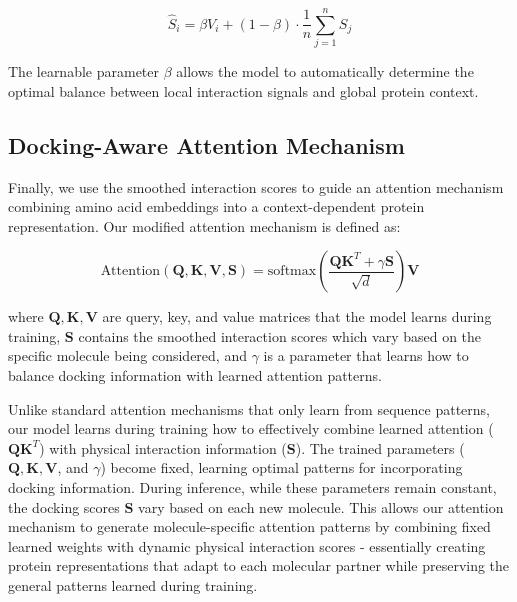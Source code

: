 \documentclass[sigconf]{acmart}
\begin{document}
\begin{equation}
    \hat{S}_i = \beta V_i + (1-\beta) \cdot \frac{1}{n}\sum_{j=1}^n S_j
\end{equation}

The learnable parameter $\beta$ allows the model to automatically determine the optimal balance between local interaction signals and global protein context.



\subsection{Docking-Aware Attention Mechanism}
\label{sec:daa_mechanism}
Finally, we use the smoothed interaction scores to guide an attention mechanism combining amino acid embeddings into a context-dependent protein representation. Our modified attention mechanism is defined as:

\begin{equation}
    \text{Attention}(\mathbf{Q}, \mathbf{K}, \mathbf{V}, \mathbf{S}) = \text{softmax}\left(\frac{\mathbf{Q}\mathbf{K}^T + \gamma{\mathbf{S}}}{\sqrt{d}}\right)\mathbf{V}
\end{equation}

where $\mathbf{Q}, \mathbf{K}, \mathbf{V}$ are query, key, and value matrices that the model learns during training, ${\mathbf{S}}$ contains the smoothed interaction scores which vary based on the specific molecule being considered, and $\gamma$ is a parameter that learns how to balance docking information with learned attention patterns.


Unlike standard attention mechanisms that only learn from sequence patterns, our model learns during training how to effectively combine learned attention ($\mathbf{Q}\mathbf{K}^T$) with physical interaction information ($\mathbf{S}$). The trained parameters ($\mathbf{Q}, \mathbf{K}, \mathbf{V}$, and $\gamma$) become fixed, learning optimal patterns for incorporating docking information. During inference, while these parameters remain constant, the docking scores $\mathbf{S}$ vary based on each new molecule. This allows our attention mechanism to generate molecule-specific attention patterns by combining fixed learned weights with dynamic physical interaction scores - essentially creating protein representations that adapt to each molecular partner while preserving the general patterns learned during training.





\end{document}
